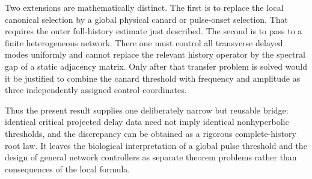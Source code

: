 Two extensions are mathematically distinct.  The first is to replace the
local canonical selection by a global physical canard or pulse-onset
selection.  That requires the outer full-history estimate just described.
The second is to pass to a finite heterogeneous network.  There one must
control all transverse delayed modes uniformly and cannot replace the
relevant history operator by the spectral gap of a static adjacency matrix.
Only after that transfer problem is solved would it be justified to combine
the canard threshold with frequency and amplitude as three independently
assigned control coordinates.

Thus the present result supplies one deliberately narrow but reusable
bridge: identical critical projected delay data need not imply identical
nonhyperbolic thresholds, and the discrepancy can be obtained as a rigorous
complete-history root law.  It leaves the biological interpretation of a
global pulse threshold and the design of general network controllers as
separate theorem problems rather than consequences of the local formula.
